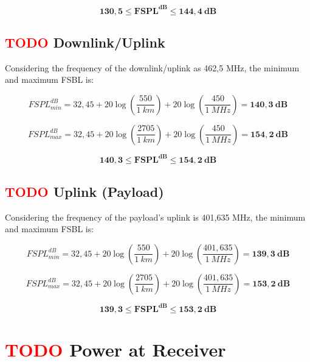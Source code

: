 \begin{equation}
    \mathbf{130,5 \leq FSPL^{dB} \leq 144,4\ dB}
\end{equation}

\subsection{ \textcolor{red}{TODO} Downlink/Uplink}

Considering the frequency of the downlink/uplink as 462,5 MHz, the minimum and maximum FSBL is:

\begin{equation}
    FSPL^{dB}_{min} = 32,45 + 20\log\left(\frac{550}{1\ km}\right) + 20\log\left(\frac{450}{1\ MHz}\right) = \mathbf{140,3\ dB}
\end{equation}

\begin{equation}
    FSPL^{dB}_{max} = 32,45 + 20\log\left(\frac{2705}{1\ km}\right) + 20\log\left(\frac{450}{1\ MHz}\right) = \mathbf{154,2\ dB}
\end{equation}

\begin{equation}
    \mathbf{140,3 \leq FSPL^{dB} \leq 154,2\ dB}
\end{equation}

\subsection{ \textcolor{red}{TODO} Uplink (Payload)}

Considering the frequency of the payload's uplink is 401,635 MHz, the minimum and maximum FSBL is:

\begin{equation}
    FSPL^{dB}_{min} = 32,45 + 20\log\left(\frac{550}{1\ km}\right) + 20\log\left(\frac{401,635}{1\ MHz}\right) = \mathbf{139,3\ dB}
\end{equation}

\begin{equation}
    FSPL^{dB}_{max} = 32,45 + 20\log\left(\frac{2705}{1\ km}\right) + 20\log\left(\frac{401,635}{1\ MHz}\right) = \mathbf{153,2\ dB}
\end{equation}

\begin{equation}
    \mathbf{139,3 \leq FSPL^{dB} \leq 153,2\ dB}
\end{equation}

\section{ \textcolor{red}{TODO} Power at Receiver}

